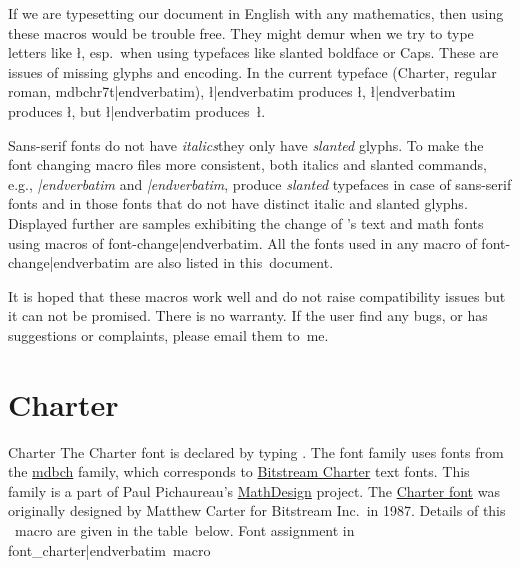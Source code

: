 {{
If we are typesetting our document in English with any mathematics, then using these macros would be trouble free. They might demur when we try to type letters like \l, esp.\ when using typefaces like {\slbf slanted boldface\/} or {\caps Caps}. These are issues of missing glyphs and encoding. In the current typeface (Charter, regular roman, {\verbatim mdbchr7t|endverbatim}), {\color{brown}\verbatim\l|endverbatim} produces \l, {\color{brown}\verbatim\slbf \l|endverbatim} produces {\slbf \l}, but {\color{brown}\verbatim\caps\l|endverbatim} produces~{\caps \l}.

Sans-serif fonts do not have {\it italics}\emdash they only have {\sl slanted\/} glyphs. To make the font changing macro files more consistent, both italics and slanted commands, e.g., {\color{brown}\verbatim\it|endverbatim} and {\color{brown}\verbatim\sl|endverbatim}, produce {\sl slanted} typefaces in case of sans-serif fonts and in those fonts that do not have distinct italic and slanted glyphs. Displayed further are samples exhibiting the change of \capstex's text and math fonts using macros of {\color{brown}\verbatim font-change|endverbatim}. All the fonts used in any macro of {\color{brown}\verbatim font-change|endverbatim} are also listed in this~document.

It is hoped that these macros work well and do not raise compatibility issues but it can not be promised. There is no warranty. If the user find any bugs, or has suggestions or complaints, please email them to~me.




















\section{\sixteenbf\fontss Charter}{Charter}
\sample
\ii The Charter font is declared by typing {\color{brown}\verbatim}. The font family uses fonts from the \href{http://www.ctan.org/tex-archive/help/Catalogue/entries/mathdesign-charter.html}{mdbch} family, which corresponds to \href{http://www.ctan.org/tex-archive/help/Catalogue/entries/charter.html}{Bitstream Charter} text fonts. This family is a part of Paul Pichaureau's \href{http://www.ctan.org/tex-archive/help/Catalogue/entries/mathdesign.html}{MathDesign} project. The \href{http://new.myfonts.com/fonts/bitstream/charter-bt-pro/}{Charter font} was originally designed by Matthew Carter for Bitstream Inc.\ in 1987. Details of this \capstex\ macro are given in the table~below.
\bs
\hfil{Font assignment in {\color{brown}\verbatim font_charter|endverbatim}~macro}\hfil

}}

